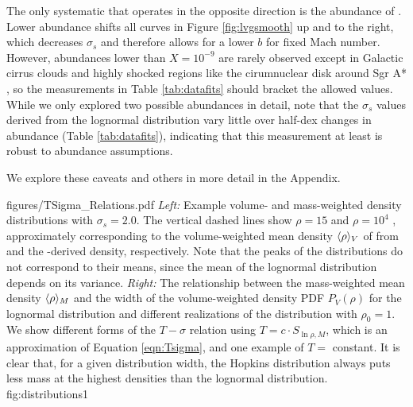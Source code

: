 The only systematic that operates in the opposite direction is the abundance of
\ortho.  Lower abundance shifts all curves in Figure \ref{fig:lvgsmooth} up and
to the right, which decreases $\sigma_s$ and therefore allows for a lower $b$
for fixed Mach number.  However, abundances lower  than $X=10^{-9}$ are rarely
observed except in Galactic cirrus clouds \citep{Turner1989a} and highly
shocked regions like the cirumnuclear disk around Sgr A* \citep{Pauls1996a}, so
the measurements in Table \ref{tab:datafits} should bracket the allowed values.
While we only explored two possible abundances in detail, note that the
$\sigma_s$ values derived from the lognormal distribution vary little over
half-dex changes in abundance (Table \ref{tab:datafits}), indicating that this
measurement at least is robust to abundance assumptions.

We explore these caveats and others in more detail in the Appendix.

{figures/TSigma_Relations.pdf}
{ %
\textit{Left:} Example volume- and mass-weighted density distributions with
$\sigma_s=2.0$.  The vertical dashed lines show $\rho = 15$ \percc and $\rho=10^4$ \percc,
approximately corresponding to the volume-weighted mean density $\langle\rho\rangle_V$ of \GRSMC from \thirteenco
and the \formaldehyde-derived density, respectively.  Note that the peaks of the distributions do not correspond to their
means, since the mean of the lognormal distribution depends on its variance.
\textit{Right:} The relationship between the mass-weighted mean density
$\langle\rho\rangle_M$ and the width of the volume-weighted density PDF $P_V(\rho)$ for the
lognormal distribution and different realizations of the \citet{Hopkins2013a}
distribution with $\rho_0=1$.  We show different forms of the $T-\sigma$
relation using $T=c \cdot S_{\ln \rho,M}$, which is an approximation of
Equation \ref{eqn:Tsigma}, and one example of $T=$ constant.  It is clear that, for a
given distribution width, the Hopkins distribution always puts less mass at the
highest densities than the lognormal
distribution.}
{fig:distributions}{1}%

% 

